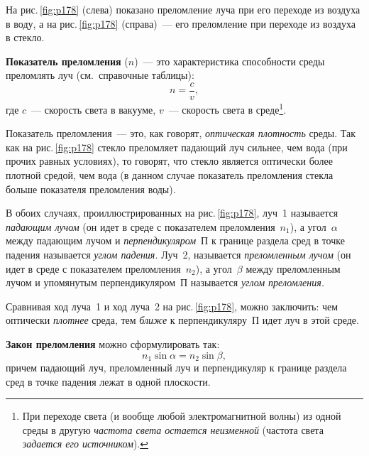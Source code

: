 \documentclass[main.tex]{subfiles}
\begin{document}
На рис.\,\ref{fig:p178} (слева) показано преломление луча при его переходе из воздуха в воду, а на рис.\,\ref{fig:p178} (справа)~--- его преломление при переходе из воздуха в стекло. 

\textbf{Показатель преломления} ($n$)~--- это характеристика способности среды преломлять луч (см.~справочные таблицы):
\begin{equation}
    n=\frac{c}{v},
\end{equation}
где $c$~--- скорость света в вакууме, $v$~--- скорость света в среде\footnote{При переходе света (и вообще любой электромагнитной волны) из одной среды в другую \emph{частота света остается неизменной} (частота света \emph{задается его источником}).}.

Показатель преломления~--- это, как говорят, \emph{оптическая плотность} среды. Так как на рис.\,\ref{fig:p178} стекло преломляет падающий луч сильнее, чем вода (при прочих равных условиях), то говорят, что стекло является оптически более плотной средой, чем вода (в данном случае показатель преломления стекла больше показателя преломления воды).

В обоих случаях, проиллюстрированных на рис.\,\ref{fig:p178}, луч~1 называется \emph{падающим лучом} (он идет в среде с показателем преломления~$n_1$), а угол~$\alpha$ между падающим лучом и \emph{перпендикуляром}~П к границе раздела сред в точке падения называется \emph{углом падения.} Луч~2, называется \emph{преломленным лучом} (он идет в среде с показателем преломления~$n_2$), а угол~$\beta$ между преломленным лучом и упомянутым перпендикуляром~П называется \emph{углом преломления.}   

Сравнивая ход луча~1 и ход луча~2 на рис.\,\ref{fig:p178}, можно заключить: чем оптически \emph{плотнее} среда, тем \emph{ближе} к перпендикуляру~П идет луч в этой среде. 

\textbf{Закон преломления} можно сформулировать так:
    \begin{equation}
        \label{e40}
        n_1\sin\alpha=n_2\sin\beta,
    \end{equation}
причем падающий луч, преломленный луч и перпендикуляр к границе раздела сред в точке падения лежат в одной плоскости.


























 
\end{document}
